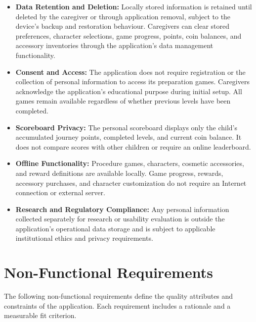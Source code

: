 \documentclass[12pt]{article}
\begin{document}
\begin{itemize}
    \item \textbf{Data Retention and Deletion:}
    Locally stored information is retained until
    deleted by the caregiver or through application
    removal, subject to the device's backup and
    restoration behaviour. Caregivers can clear
    stored preferences, character selections,
    game progress, points, coin balances, and
    accessory inventories through the application's
    data management functionality.

    \item \textbf{Consent and Access:}
    The application does not require registration
    or the collection of personal information
    to access its preparation games. Caregivers
    acknowledge the application's educational
    purpose during initial setup. All games remain
    available regardless of whether previous
    levels have been completed.

    \item \textbf{Scoreboard Privacy:}
    The personal scoreboard displays only the child's
    accumulated journey points, completed levels,
    and current coin balance. It does not compare
    scores with other children or require an
    online leaderboard.

    \item \textbf{Offline Functionality:}
    Procedure games, characters, cosmetic accessories,
    and reward definitions are available locally.
    Game progress, rewards, accessory purchases,
    and character customization do not require
    an Internet connection or external server.

    \item \textbf{Research and Regulatory Compliance:}
    Any personal information collected separately
    for research or usability evaluation is outside
    the application's operational data storage
    and is subject to applicable institutional
    ethics and privacy requirements.

\end{itemize}


\section{Non-Functional Requirements}
\label{non-func-req}

The following non-functional requirements define the quality attributes
and constraints of the application. Each requirement includes a rationale
and a measurable fit criterion.
\end{document}
